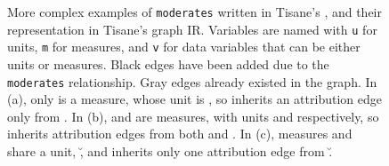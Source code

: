 {\begin{figure}[H]
       \caption{More complex examples of \texttt{moderates} written in Tisane's \SDSLlong, and their representation in Tisane's graph IR. Variables are named with \texttt{u} for units, \texttt{m} for measures, and \texttt{v} for data variables that can be either units or measures. Black edges have been added due to the \texttt{moderates} relationship. Gray edges already existed in the graph. In (a), only \mone is a measure, whose unit is \utwo, so \umone inherits an attribution edge only from \utwo. In (b), \mone and \mtwo are measures, with units \uone and \utwo respectively, so \monetwo inherits attribution edges from both \uone and \utwo. In (c), measures \mone and \mtwo share a unit, \u, and \monetwo inherits only one attribution edge from \u.}
       \label{fig:figureComplexModeratesGraphIR}
   \end{figure}
}


